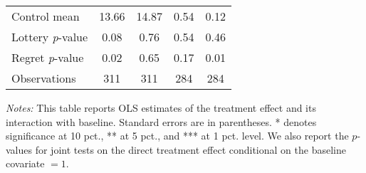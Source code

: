 \begin{table}[ht]
{\begin{threeparttable}
\begin{tabular}{l*{4}{c}}
Control mean    &    13.66         &    14.87         &     0.54         &     0.12         \\
Lottery \emph{p}-value&     0.08         &     0.76         &     0.54         &     0.46         \\
Regret \emph{p}-value&     0.02         &     0.65         &     0.17         &     0.01         \\
Observations    &      311         &      311         &      284         &      284         \\
\bottomrule \end{tabular} \begin{tablenotes}[flushleft] \footnotesize \item \emph{Notes:} This table reports OLS estimates of the treatment effect and its interaction with baseline. Standard errors are in parentheses. * denotes significance at 10 pct., ** at 5 pct., and *** at 1 pct. level. We also report the \(p\)-values for joint tests on the direct treatment effect conditional on the baseline covariate $= 1$. \end{tablenotes} \end{threeparttable} } \end{table}

